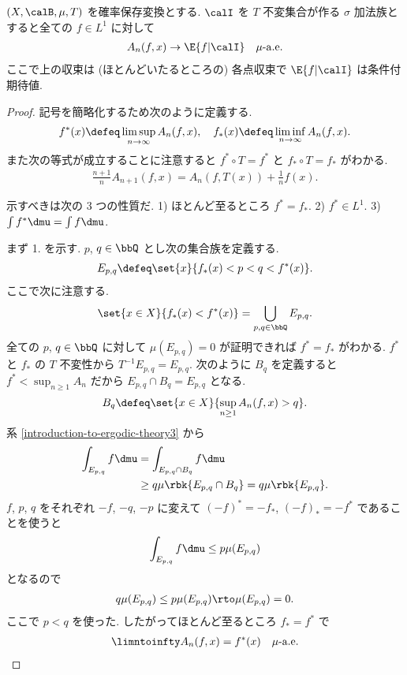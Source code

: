 \documentclass[openany, a4paper, oneside]{jsbook}
\begin{document}
\begin{thm}\label{introduction-to-ergodic-theory28}
$(X, \calB, \mu, T)$ を確率保存変換とする.
$\calI$ を $T$ 不変集合が作る $\sigma$ 加法族とすると全ての $f \in L^1$ に対して
\begin{align}
 A_n (f, x)
 \to
 \E{f | \calI} \quad \mu \mathchar`- \mathrm{a.e.}
\end{align}
ここで上の収束は (ほとんどいたるところの) 各点収束で $\E{f | \calI}$ は条件付期待値.
\end{thm}
\begin{proof}
記号を簡略化するため次のように定義する.
\begin{align}
 f^*(x)
 \defeq
 \limsup_{n \to \infty} A_n(f, x), \quad
 f_* (x)
 \defeq
 \liminf_{n \to \infty} A_n(f, x).
\end{align}
また次の等式が成立することに注意すると $f^* \circ T = f^*$ と $f_* \circ T = f_*$ がわかる.
\begin{align}
 \frac{n+1}{n} A_{n + 1}(f, x)
 =
 A_n (f, T(x)) + \frac{1}{n} f(x).
\end{align}

示すべきは次の 3 つの性質だ.
1) ほとんど至るところ $f^* = f_*$.
2) $f^* \in L^1$.
3) $\int f^* \dmu = \int f \dmu$.

まず 1. を示す.
$p$, $q \in \bbQ$ とし次の集合族を定義する.
\begin{align}
 E_{p, q}
 \defeq
 \set{x}{f_* (x) < p < q < f^* (x)}.
\end{align}
ここで次に注意する.
\begin{align}
 \set{x \in X}{f_* (x) < f^* (x)}
 =
 \bigcup_{p, q \in \bbQ} E_{p, q}.
\end{align}
全ての $p$, $q \in \bbQ$ に対して $\mu (E_{p, q}) = 0$ が証明できれば $f^* = f_*$ がわかる.
$f^*$ と $f_*$ の $T$ 不変性から $T^{-1} E_{p, q} = E_{p,q}$.
次のように $B_{q}$ を定義すると $f^* < \sup_{n \geq 1} A_n$ だから $E_{p, q} \cap B_{q} = E_{p, q}$ となる.
\begin{align}
 B_{q}
 \defeq
 \set{x \in X}{\sup_{n \geq 1} A_n(f, x) > q}.
\end{align}
系 \ref{introduction-to-ergodic-theory3} から
\begin{align}
 \int_{E_{p,q}} f \dmu
 &=
 \int_{E_{p,q} \cap B_{q}} f \dmu \\
 &\geq
 q \mu \rbk{E_{p, q} \cap B_{q}}
 =
 q \mu \rbk{E_{p, q}}.
\end{align}
$f$, $p$, $q$ をそれぞれ $-f$, $-q$, $-p$ に変えて $(-f)^* = - f_*$, $(-f)_* = - f^*$ であることを使うと
\begin{align}
 \int_{E_{p,q}} f \dmu
 \leq
 p \mu (E_{p,q})
\end{align}
となるので
\begin{align}
 q \mu (E_{p, q})
 \leq
 p \mu (E_{p, q})
 \rto
 \mu (E_{p, q}) = 0.
\end{align}
ここで $p < q$ を使った.
したがってほとんど至るところ $f_* = f^*$ で
\begin{align}
 \limntoinfty A_n(f, x)
 =
 f^* (x) \quad \mu \text{-a.e.}
\end{align}


\end{proof}
\end{document}
